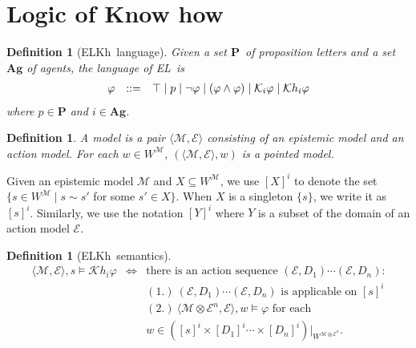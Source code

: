 \documentclass{article}
\newtheorem{definition}[theorem]{Definition}
\newcommand{\EL}{\textsf{EL}}
\newcommand{\ELKh}{\textsf{ELKh}}
\newcommand{\Ag}{\ensuremath{\mathbf{Ag}}}
\newcommand{\BP}{\ensuremath{\mathbf{P}}}
\newcommand{\M}{\mathcal{M}}
\newcommand{\E}{\mathcal{E}}
\newcommand{\lr}[1]{\langle #1 \rangle}
\newcommand{\Kh}{\mathcal{K}h}
\newcommand{\K}{\mathcal{K}}
\renewcommand{\phi}{\varphi}
\begin{document}
\section{Logic of Know how}
\begin{definition}[\ELKh\ language]
	Given a set \BP\ of proposition letters and a set $\Ag$ of agents, the language of \EL\ is 
	$$\begin{array}{r@{\quad::= \quad}l}
	\varphi  &
	\top\mid p
	\mid \neg \varphi
	\mid (\varphi \land \varphi)
	\mid \K_i\phi 
	\mid \Kh_i \phi \\
	\end{array}$$
	where $p\in\BP$ %
	and $i\in\Ag$. 
\end{definition}

\begin{definition}
    A model is a pair $\lr{\M,\E}$ consisting of an epistemic model and an action model. For each $w\in W^\M$, $(\lr{\M,\E},w)$ is a pointed model.
\end{definition}

Given an epistemic model $\M$ and $X\subseteq W^\M$, we use $[X]^i$ to denote the set $\{s\in W^\M\mid s\sim s'$ for some $s'\in X \}$. When $X$ is a singleton $\{s\}$, we write it as $[s]^i$. Similarly, we use the notation $[Y]^i$ where $Y$ is a subset of the domain of an action model $\E$.
\begin{definition}[\ELKh\ semantics]
$$\begin{array}{lll}
\lr{\M,\E},s\vDash\Kh_i\phi &\iff& \text{there is an action sequence $(\E,D_1)\cdots (\E,D_{n})$:}\\
&&(1.)\ (\E,D_1)\cdots (\E,D_{n}) \text{ is applicable on }[s]^i\\
&&(2.)\ \lr{\M\otimes\E^n,\E}, w\vDash\phi \text{ for each }\\
&&w\in ([s]^i\times[ D_1]^i\cdots \times [D_n]^i)|_{W^{\M\otimes\E^n}}.
\end{array}$$
\end{definition}
\end{document}
